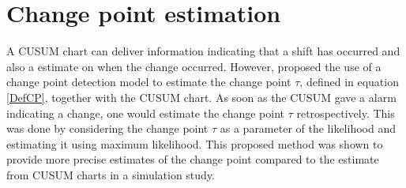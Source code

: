 \section{Change point estimation}\label{CPDsection}
A CUSUM chart can deliver information indicating that a shift has occurred and also a estimate on when the change occurred. However, \citet{pignatiello2001estimation} proposed the use of a change point detection model to estimate the change point $\tau$, defined in equation \eqref{DefCP}, together with the CUSUM chart. As soon as the CUSUM gave a alarm indicating a change, one would estimate the change point $\tau$ retrospectively. This was done by considering the change point $\tau$ as a parameter of the likelihood and estimating it using maximum likelihood. This proposed method was shown to provide more precise estimates of the change point compared to the estimate from CUSUM charts in a simulation study. 

